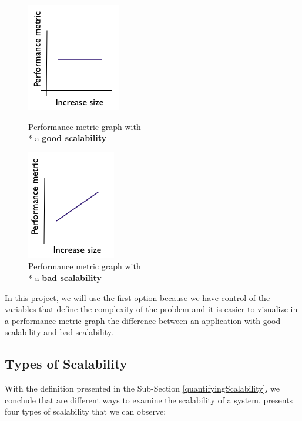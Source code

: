 \begin{figure}[ht]
\begin{minipage}[b]{0.5\linewidth}
\centering
\includegraphics[scale=0.7]{images/scalabilitygood}
\caption{Performance metric graph with \\* a \textbf{good scalability}}
\label{fig:goodscalability}
\end{minipage}
\hspace{0.5cm}
\begin{minipage}[b]{0.5\linewidth}
\centering
\includegraphics[scale=0.7]{images/scalabilitybad}
\caption{Performance metric graph with \\* a \textbf{bad scalability}}
\label{fig:badscalability}
\end{minipage}
\end{figure}


In this project, we will use the first option because we have control of the variables that define the complexity of the problem and it is easier to visualize in a performance metric graph the difference between an application with good scalability and bad scalability.

\subsection{Types of Scalability}
With the definition presented in the Sub-Section \ref{quantifyingScalability}, we conclude that are different ways to examine the scalability of a system. \cite{BONDI} presents four types of scalability that we can observe:

